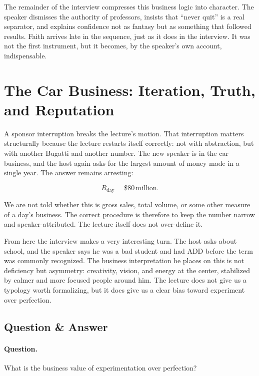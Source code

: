 The remainder of the interview compresses this business logic into character. The speaker dismisses the authority of professors, insists that ``never quit'' is a real separator, and explains confidence not as fantasy but as something that followed results. Faith arrives late in the sequence, just as it does in the interview. It was not the first instrument, but it becomes, by the speaker's own account, indispensable.

\section{The Car Business: Iteration, Truth, and Reputation}

A sponsor interruption breaks the lecture's motion. That interruption matters structurally because the lecture restarts itself correctly: not with abstraction, but with another Bugatti and another number. The new speaker is in the car business, and the host again asks for the largest amount of money made in a single year. The answer remains arresting:

\begin{equation}
R_{\text{day}}=\$80\,\text{million}.
\end{equation}

We are not told whether this is gross sales, total volume, or some other measure of a day's business. The correct procedure is therefore to keep the number narrow and speaker-attributed. The lecture itself does not over-define it.

From here the interview makes a very interesting turn. The host asks about school, and the speaker says he was a bad student and had ADD before the term was commonly recognized. The business interpretation he places on this is not deficiency but asymmetry: creativity, vision, and energy at the center, stabilized by calmer and more focused people around him. The lecture does not give us a typology worth formalizing, but it does give us a clear bias toward experiment over perfection.

\subsection{Question \& Answer}

\paragraph{Question.} What is the business value of experimentation over perfection?

